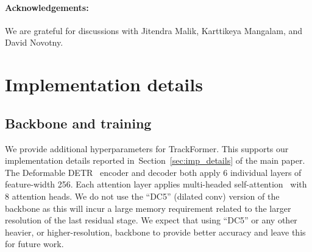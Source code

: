 \documentclass[10pt,twocolumn,letterpaper]{article}
\newcommand{\secref}[1]{Section~\ref{#1}}
\newif\ifarxiv
\begin{document}
    \paragraph{Acknowledgements:} We are grateful for discussions with Jitendra Malik, Karttikeya Mangalam, and David Novotny.
\fi



\ificcvfinal\thispagestyle{empty}\fi

\ifarxiv
    \newcount\cvprrulercount
\appendix

\def\suppabstract{This section provides additional material for the main paper:
\S\ref{sec:impl_details} contains further implementation details for TrackFormer (\S\ref{sec:trackformer_details}), a visualization of the Transformer encoder-decoder architecture  (\S\ref{sec:impl_details_enc_dec}), and parameters for multi-object tracking (\S\ref{sec:impl_details_params}).  \S\ref{sec:results} contains a discussion related to public detection evaluation (\S\ref{sec:results_public}), and detailed per-sequence results for MOT17 and MOTS20 (\S\ref{sec:results_sequences}).}

\ifarxiv
    \section*{Appendix}
    \suppabstract
\fi

\newcommand{\sref}[1]{Sec.~\ref{#1}}
\setcounter{table}{0}
\renewcommand{\thetable}{A.\arabic{table}}

\setcounter{figure}{0}
\renewcommand{\thefigure}{A.\arabic{figure}}
\thispagestyle{empty}

\unless\ifarxiv
    \begin{abstract}
        \suppabstract
    \end{abstract}
\fi

\section{Implementation details} \label{sec:impl_details}
\subsection{Backbone and training} \label{sec:trackformer_details}

We provide additional hyperparameters for \mbox{TrackFormer}. This supports our implementation details reported in~\secref{sec:imp_details} of the main paper.
The Deformable DETR~\cite{deformable_detr} encoder and decoder both apply 6 individual layers of feature-width 256.
Each attention layer applies multi-headed self-attention~\cite{attention_is_all_you_need} with 8 attention heads.
We do not use the ``DC5'' (dilated conv) version of the backbone as this will incur a large memory requirement related to the larger resolution of the last residual stage.
We expect that using ``DC5'' or any other heavier, or higher-resolution, backbone to provide better accuracy and leave this for future work.
\end{document}
